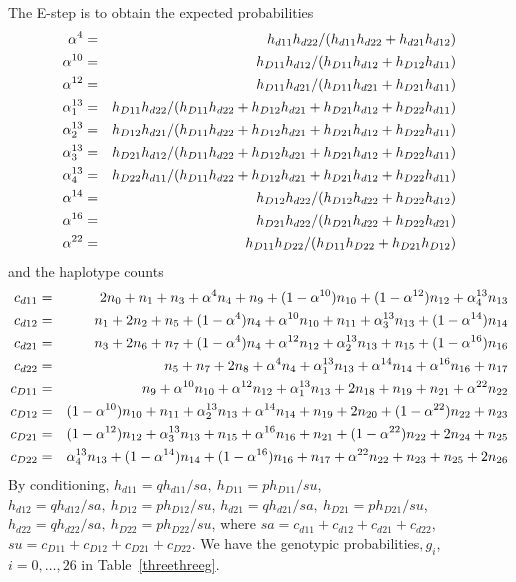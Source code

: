 The E-step is to obtain the expected probabilities
\begin{eqnarray*}
\alpha^4&=& h_{d11} h_{d22}/(h_{d11} h_{d22}+h_{d21} h_{d12})\cr
\alpha^{10}&=& h_{D11} h_{d12}/(h_{D11} h_{d12}+h_{D12} h_{d11})\cr
\alpha^{12}&=& h_{D11} h_{d21}/(h_{D11} h_{d21}+h_{D21} h_{d11})\cr
\alpha^{13}_1&=&h_{D11} h_{d22}/(h_{D11} h_{d22}+h_{D12} h_{d21}+h_{D21} h_{d12}+h_{D22} h_{d11})\cr
\alpha^{13}_2&=&h_{D12} h_{d21}/(h_{D11} h_{d22}+h_{D12} h_{d21}+h_{D21} h_{d12}+h_{D22} h_{d11})\cr
\alpha^{13}_3&=&h_{D21} h_{d12}/(h_{D11} h_{d22}+h_{D12} h_{d21}+h_{D21} h_{d12}+h_{D22} h_{d11})\cr
\alpha^{13}_4&=&h_{D22} h_{d11}/(h_{D11} h_{d22}+h_{D12} h_{d21}+h_{D21} h_{d12}+h_{D22} h_{d11})\cr
\alpha^{14}&=&h_{D12} h_{d22}/(h_{D12} h_{d22}+h_{D22} h_{d12})\cr
\alpha^{16}&=&h_{D21} h_{d22}/(h_{D21} h_{d22}+h_{D22} h_{d21})\cr
\alpha^{22}&=&h_{D11} h_{D22}/(h_{D11} h_{D22}+h_{D21} h_{D12})
\end{eqnarray*}
and the haplotype counts
\begin{eqnarray*}
 c_{d11}&=&2 n_{0}+n_{1}+n_{3}+\alpha^4 n_{4}+n_{9}+(1-\alpha^{10}) n_{10}+(1-\alpha^{12}) n_{12}+\alpha^{13}_4 n_{13}\cr
 c_{d12}&=&n_{1}+2 n_{2}+n_{5}+(1-\alpha^4) n_{4}+\alpha^{10} n_{10}+n_{11}+\alpha^{13}_3 n_{13}+(1-\alpha^{14}) n_{14}\cr
 c_{d21}&=&n_{3}+2 n_{6}+n_{7}+(1-\alpha^4) n_{4}+\alpha^{12} n_{12}+\alpha^{13}_2 n_{13}+n_{15}+(1-\alpha^{16}) n_{16}\cr
 c_{d22}&=&n_{5}+n_{7}+2 n_{8}+\alpha^4 n_{4}+\alpha^{13}_1 n_{13}+\alpha^{14} n_{14}+\alpha^{16} n_{16}+n_{17}\cr
 c_{D11}&=&n_{9}+\alpha^{10} n_{10}+\alpha^{12} n_{12}+\alpha^{13}_1 n_{13}+2 n_{18}+n_{19}+n_{21}+\alpha^{22} n_{22}\cr
 c_{D12}&=&(1-\alpha^{10}) n_{10}+n_{11}+\alpha^{13}_2 n_{13}+\alpha^{14} n_{14}+n_{19}+2 n_{20}+(1-\alpha^{22}) n_{22}+n_{23}\cr
 c_{D21}&=&(1-\alpha^{12}) n_{12}+\alpha^{13}_3 n_{13}+n_{15}+\alpha^{16} n_{16}+n_{21}+(1-\alpha^{22}) n_{22}+2 n_{24}+n_{25}\cr
 c_{D22}&=&\alpha^{13}_4 n_{13}+(1-\alpha^{14}) n_{14}+(1-\alpha^{16}) n_{16}+n_{17}+\alpha^{22} n_{22}+n_{23}+n_{25}+2 n_{26}
\end{eqnarray*}
By conditioning,
 $h_{d11}=q h_{d11}/sa,\ h_{D11} = p h_{D11}/su$,
 $h_{d12}=q h_{d12}/sa,\ h_{D12} = p h_{D12}/su$,
 $h_{d21}=q h_{d21}/sa,\ h_{D21} = p h_{D21}/su$,
 $h_{d22}=q h_{d22}/sa,\ h_{D22} = p h_{D22}/su$,
where $sa=c_{d11}+c_{d12}+c_{d21}+c_{d22}$,
$su=c_{D11}+c_{D12}+c_{D21}+c_{D22}$.
We have the genotypic probabilities$, g_i$, $i=0,\ldots,26$ in
Table~\ref{threethreeg}.

